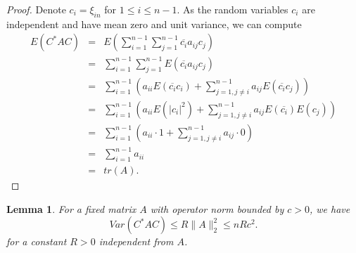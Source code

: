 \documentclass[12pt,a4paper,leqno]{report}
\theoremstyle{plain}
\newtheorem{lem}[equation]{Lemma}
\theoremstyle{definition}
\theoremstyle{remark}
\begin{document}
\begin{proof}
Denote $c_i = \xi_{in}$ for $1 \leq i \leq n-1$.
As the random variables $c_i$ are independent and have mean zero and unit variance, we can compute
\begin{eqnarray*}
E(C^* A C) & = & E(\sum_{i=1}^{n-1} \sum_{j=1}^{n-1} \overline{c_i} a_{ij} c_j)\\
& = & \sum_{i=1}^{n-1} \sum_{j=1}^{n-1} E(\overline{c_i} a_{ij} c_j)\\
& = & \sum_{i=1}^{n-1} (a_{ii} E(\overline{c_i}c_i) + \sum_{j=1,j \neq i}^{n-1} a_{ij} E(\overline{c_i} c_j))\\
& = & \sum_{i=1}^{n-1} (a_{ii} E(|c_i|^2 ) + \sum_{j=1,j \neq i}^{n-1} a_{ij} E(\overline{c_i}) E(c_j))\\
& = & \sum_{i=1}^{n-1} (a_{ii} \cdot 1 + \sum_{j=1,j \neq i}^{n-1} a_{ij} \cdot 0)\\
& = & \sum_{i=1}^{n-1} a_{ii}\\
& = & tr(A).
\end{eqnarray*} 
\end{proof}

\begin{lem}
For a fixed matrix $A$ with operator norm bounded by $c>0$, we have
\begin{equation*}
Var(C^* A C) \leq R \| A \|_2^2 \leq n R c^2.
\end{equation*}
for a constant $R>0$ independent from $A$.
\end{lem}
\end{document}
